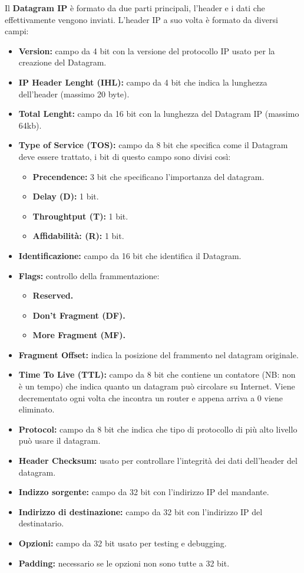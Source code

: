 Il \textbf{Datagram IP} è formato da due parti principali, l'header e i dati che effettivamente vengono inviati.
L'header IP a suo volta è formato da diversi campi:
\begin{itemize}
    \item \textbf{Version:} campo da 4 bit con la versione del protocollo IP usato per la creazione del Datagram.
    \item \textbf{IP Header Lenght (IHL):} campo da 4 bit che indica la lunghezza dell'header (massimo 20 byte).
    \item \textbf{Total Lenght:} campo da 16 bit con la lunghezza del Datagram IP (massimo 64kb).
    \item \textbf{Type of Service (TOS):} campo da 8 bit che specifica come il Datagram deve essere trattato, i bit di questo campo sono divisi così:
    \begin{itemize}
        \item \textbf{Precendence:} 3 bit che specificano l'importanza del datagram.
        \item \textbf{Delay (D):} 1 bit.
        \item \textbf{Throughtput (T):} 1 bit.
        \item \textbf{Affidabilità: (R):} 1 bit.
    \end{itemize}
    \item \textbf{Identificazione:} campo da 16 bit che identifica il Datagram.
    \item \textbf{Flags:} controllo della frammentazione:
    \begin{itemize}
        \item \textbf{Reserved.}
        \item \textbf{Don't Fragment (DF).}
        \item \textbf{More Fragment (MF).}
    \end{itemize}
    \item \textbf{Fragment Offset:} indica la posizione del frammento nel datagram originale.
    \item \textbf{Time To Live (TTL):} campo da 8 bit che contiene un contatore (NB: non è un tempo) che indica quanto un datagram può circolare su Internet. Viene decrementato ogni volta che incontra un router e appena arriva a 0 viene eliminato.
    \item \textbf{Protocol:} campo da 8 bit che indica che tipo di protocollo di più alto livello può usare il datagram.
    \item \textbf{Header Checksum:} usato per controllare l'integrità dei dati dell'header del datagram.
    \item \textbf{Indizzo sorgente:} campo da 32 bit con l'indirizzo IP del mandante.
    \item \textbf{Indirizzo di destinazione:} campo da 32 bit con l'indirizzo IP del destinatario.
    \item \textbf{Opzioni:} campo da 32 bit usato per testing e debugging.
    \item \textbf{Padding:} necessario se le opzioni non sono tutte a 32 bit.
\end{itemize}

